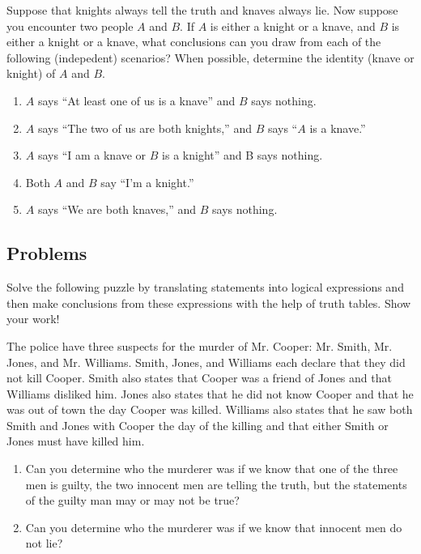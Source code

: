 \documentclass[../notes.tex]{subfiles}
\begin{document}
\begin{exercise}
    Suppose that knights always tell the truth and knaves always lie. Now suppose you encounter two people $A$ and $B$. If $A$ is either a knight or a knave, and $B$ is either a knight or a knave, what conclusions can you draw from each of the following (indepedent) scenarios? When possible, determine the identity (knave or knight) of $A$ and $B$.
    \begin{enumerate}[label=(\alph*)]
        \item $A$ says ``At least one of us is a knave'' and $B$ says nothing. 
        \item $A$ says ``The two of us are both knights,'' and $B$ says ``$A$ is a knave.''
        \item $A$ says ``I am a knave or $B$ is a knight'' and B says nothing. 
        \item Both $A$ and $B$ say ``I'm a knight.''
        \item $A$ says ``We are both knaves,'' and $B$ says nothing. 
    \end{enumerate}
\end{exercise}

\subsection{Problems}
Solve the following puzzle by translating statements into logical expressions and then make conclusions from these expressions with the help of truth tables. Show your work!
\begin{homework}
    The police have three suspects for the murder of Mr. Cooper: Mr. Smith, Mr. Jones, and Mr. Williams. Smith, Jones, and Williams each declare that they did not kill Cooper. Smith also states that Cooper was a friend of Jones and that Williams disliked him. Jones also states that he did not know Cooper and that he was out of town the day Cooper was killed. Williams also states that he saw both Smith and Jones with Cooper the day of the killing and that either Smith or Jones must have killed him.
    \begin{enumerate}[label=(\alph*)]
        \item Can you determine who the murderer was if we know that one of the three men is guilty, the two innocent men are telling the truth, but the statements of the guilty man may or may not be true? 
        \item Can you determine who the murderer was if we know that innocent men do not lie? 
    \end{enumerate}
\end{homework}
\end{document}
